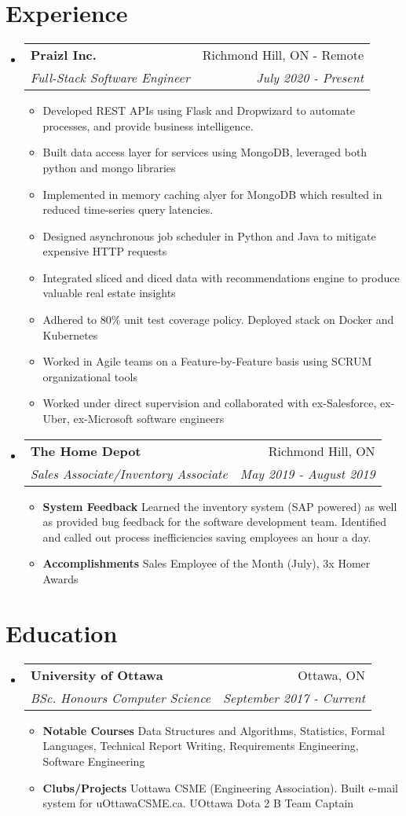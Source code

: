 \documentclass[letterpaper,11pt]{article}
\makeatletter
\newcommand{\resumeItem}[2]{
  \item\small{
    \textbf{#1}{#2 \vspace{-2pt}}
  }
}
\newcommand{\resumeSubheading}[4]{
  \vspace{-1pt}\item
    \begin{tabular*}{0.97\textwidth}[t]{l@{\extracolsep{\fill}}r}
      \textbf{#1} & #2 \\
      \textit{\small#3} & \textit{\small #4} \\
    \end{tabular*}\vspace{-5pt}
}
\newcommand{\resumeSubHeadingListStart}{\begin{itemize}[leftmargin=*]}
\newcommand{\resumeSubHeadingListEnd}{\end{itemize}}
\newcommand{\resumeItemListStart}{\begin{itemize}}
\newcommand{\resumeItemListEnd}{\end{itemize}\vspace{-5pt}}
\makeatother
\begin{document}
\section{Experience}
  \resumeSubHeadingListStart
	\resumeSubheading
	{Praizl Inc.}{Richmond Hill, ON - Remote}
	{Full-Stack Software Engineer}{July 2020 - Present}
		\resumeItemListStart
			\resumeItem{}
			{Developed  REST APIs using Flask and Dropwizard to automate processes, and provide business intelligence.}
			\resumeItem{}
			{Built data access layer for services using MongoDB, leveraged both python and mongo libraries}
			\resumeItem{}
			{Implemented in memory caching alyer for MongoDB which resulted in reduced time-series query latencies.}
			\resumeItem{}
			{Designed asynchronous job scheduler in Python and Java to mitigate expensive HTTP requests}	
			\resumeItem{}
			{Integrated sliced and diced data with recommendations engine to produce valuable real estate insights}
			\resumeItem{}
			{Adhered to 80\% unit test coverage policy. Deployed stack on Docker and Kubernetes}
			\resumeItem{}
			{Worked in Agile teams on a Feature-by-Feature basis using SCRUM organizational tools }
			\resumeItem{}
			{Worked under direct supervision and collaborated with ex-Salesforce, ex-Uber, ex-Microsoft software engineers }
		\resumeItemListEnd
	    \resumeSubheading
	      {The Home Depot}{Richmond Hill, ON}
	      {Sales Associate/Inventory Associate}{May 2019 - August 2019}
	      \resumeItemListStart
	        \resumeItem{System Feedback }
	          {Learned the inventory system (SAP powered) as well as provided bug feedback for the software development team. Identified and called out process inefficiencies saving employees an hour a day.}
		\resumeItem{Accomplishments }
		 {Sales Employee of the Month (July), 3x Homer Awards}     
\resumeItemListEnd

\resumeSubHeadingListEnd

\section{Education}
  \resumeSubHeadingListStart
    \resumeSubheading
      {University of Ottawa}{Ottawa, ON}
      {BSc. Honours Computer Science}{September 2017 - Current}
	\resumeItemListStart
		\resumeItem{Notable Courses }
		{Data Structures and Algorithms, Statistics, Formal Languages, Technical Report Writing, Requirements Engineering, Software Engineering}
	\resumeItem{Clubs/Projects }
		{Uottawa CSME (Engineering Association). Built e-mail system for uOttawaCSME.ca. UOttawa Dota 2 B Team Captain}	
	\resumeItemListEnd
  \resumeSubHeadingListEnd
\end{document}
